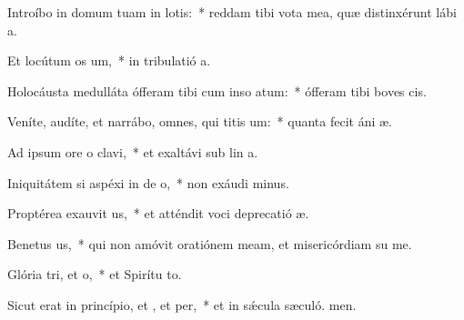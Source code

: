 \item Introíbo in domum tuam in lotis:~* reddam tibi vota mea, quæ distinxérunt lábi a.
\item Et locútum  os um,~* in tribulatió a.
\item Holocáusta medulláta ófferam tibi cum inso atum:~* ófferam tibi boves  cis.
\item Veníte, audíte, et narrábo, omnes, qui titis um:~* quanta fecit áni æ.
\item Ad ipsum ore o clavi,~* et exaltávi sub lin a.
\item Iniquitátem si aspéxi in de o,~* non exáudi minus.
\item Proptérea exauvit us,~* et atténdit voci deprecatió æ.
\item Benetus us,~* qui non amóvit oratiónem meam, et misericórdiam su  me.
\item Glória tri, et o,~* et Spirítu to.
\item Sicut erat in princípio, et , et per,~* et in sǽcula sæculó. men.
